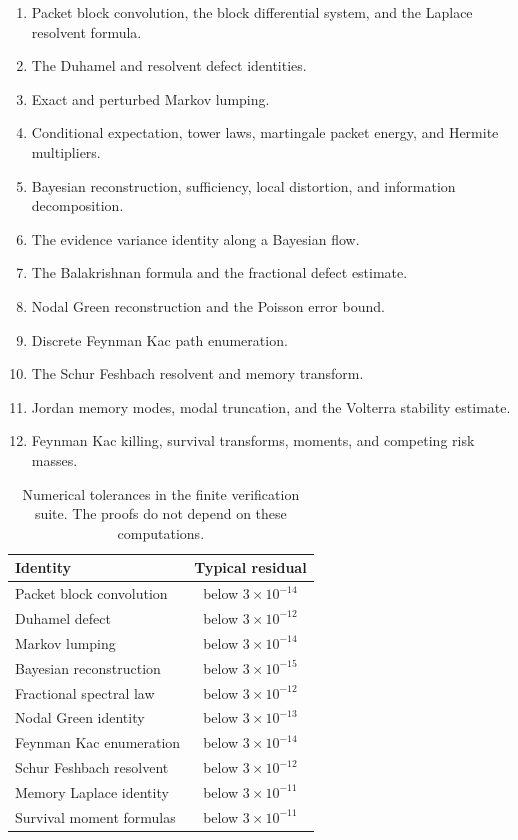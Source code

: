 \documentclass{aomart}
\theoremstyle{definition}
\theoremstyle{remark}
\begin{document}
\begin{enumerate}
\item Packet block convolution, the block differential system, and the Laplace resolvent formula.
\item The Duhamel and resolvent defect identities.
\item Exact and perturbed Markov lumping.
\item Conditional expectation, tower laws, martingale packet energy, and Hermite multipliers.
\item Bayesian reconstruction, sufficiency, local distortion, and information decomposition.
\item The evidence variance identity along a Bayesian flow.
\item The Balakrishnan formula and the fractional defect estimate.
\item Nodal Green reconstruction and the Poisson error bound.
\item Discrete Feynman Kac path enumeration.
\item The Schur Feshbach resolvent and memory transform.
\item Jordan memory modes, modal truncation, and the Volterra stability estimate.
\item Feynman Kac killing, survival transforms, moments, and competing risk masses.
\end{enumerate}

\begin{table}[t]
\centering
\begin{tabular}{lc}
\toprule
Identity & Typical residual \\
\midrule
Packet block convolution & below \(3\times10^{-14}\) \\
Duhamel defect & below \(3\times10^{-12}\) \\
Markov lumping & below \(3\times10^{-14}\) \\
Bayesian reconstruction & below \(3\times10^{-15}\) \\
Fractional spectral law & below \(3\times10^{-12}\) \\
Nodal Green identity & below \(3\times10^{-13}\) \\
Feynman Kac enumeration & below \(3\times10^{-14}\) \\
Schur Feshbach resolvent & below \(3\times10^{-12}\) \\
Memory Laplace identity & below \(3\times10^{-11}\) \\
Survival moment formulas & below \(3\times10^{-11}\) \\
\bottomrule
\end{tabular}
\caption{Numerical tolerances in the finite verification suite. The proofs do not depend on these computations.}
\label{tab:verification_tolerances}
\end{table}
\end{document}
